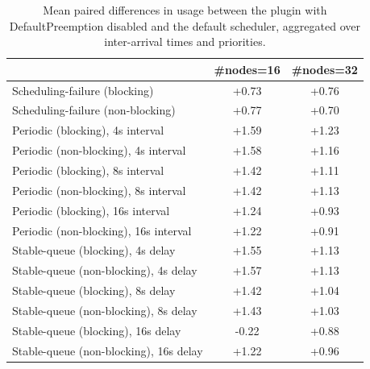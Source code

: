 \begin{table}[t]
\tiny
\setlength{\tabcolsep}{1.2pt}
\renewcommand{\arraystretch}{1.12}
\centering
\caption{Mean paired differences in usage between the plugin with DefaultPreemption disabled and the default scheduler, aggregated over inter-arrival times and priorities.}
\label{tab:usage-defpreempt0-std0-agg-arrival-prio}
\begin{tabular}{l c c}
\toprule
 & \#nodes=16 & \#nodes=32 \\
\midrule
Scheduling-failure (blocking) & +0.73 & +0.76 \\
Scheduling-failure (non-blocking) & +0.77 & +0.70 \\
Periodic (blocking), 4s interval & +1.59 & +1.23 \\
Periodic (non-blocking), 4s interval & +1.58 & +1.16 \\
Periodic (blocking), 8s interval & +1.42 & +1.11 \\
Periodic (non-blocking), 8s interval & +1.42 & +1.13 \\
Periodic (blocking), 16s interval & +1.24 & +0.93 \\
Periodic (non-blocking), 16s interval & +1.22 & +0.91 \\
Stable-queue (blocking), 4s delay & +1.55 & +1.13 \\
Stable-queue (non-blocking), 4s delay & +1.57 & +1.13 \\
Stable-queue (blocking), 8s delay & +1.42 & +1.04 \\
Stable-queue (non-blocking), 8s delay & +1.43 & +1.03 \\
Stable-queue (blocking), 16s delay & -0.22 & +0.88 \\
Stable-queue (non-blocking), 16s delay & +1.22 & +0.96 \\
\bottomrule
\end{tabular}
\end{table}
